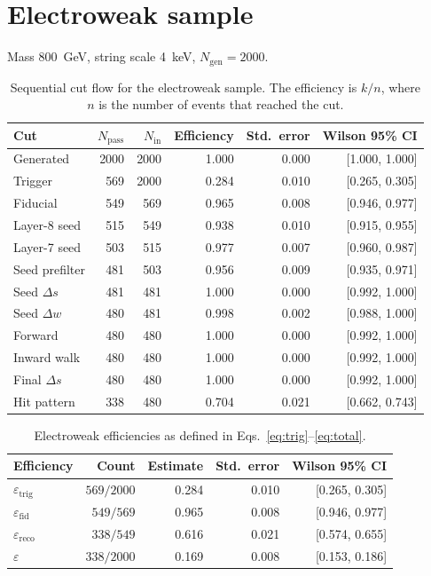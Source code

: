 \documentclass[11pt,a4paper]{article}
\begin{document}
\section{Electroweak sample}
\label{sec:ew}
Mass \SI{800}{\GeV}, string scale \SI{4}{\keV}, \(N_{\mathrm{gen}} = 2000\).

\begin{table}[H]
\centering
\caption{Sequential cut flow for the electroweak sample. The efficiency is \(k/n\), where \(n\) is the number of events that reached the cut.}
\label{tab:ew-cuts}
\small
\begin{tabular}{lrrrrr}
\toprule
Cut & \(N_{\mathrm{pass}}\) & \(N_{\mathrm{in}}\) & Efficiency & Std.\ error & Wilson 95\% CI \\
\midrule
Generated        & 2000 & 2000 & 1.000 & 0.000 & [1.000, 1.000] \\
Trigger          &  569 & 2000 & 0.284 & 0.010 & [0.265, 0.305] \\
Fiducial         &  549 &  569 & 0.965 & 0.008 & [0.946, 0.977] \\
Layer-8 seed     &  515 &  549 & 0.938 & 0.010 & [0.915, 0.955] \\
Layer-7 seed     &  503 &  515 & 0.977 & 0.007 & [0.960, 0.987] \\
Seed prefilter   &  481 &  503 & 0.956 & 0.009 & [0.935, 0.971] \\
Seed \(\Delta s\) &  481 &  481 & 1.000 & 0.000 & [0.992, 1.000] \\
Seed \(\Delta w\) &  480 &  481 & 0.998 & 0.002 & [0.988, 1.000] \\
Forward          &  480 &  480 & 1.000 & 0.000 & [0.992, 1.000] \\
Inward walk      &  480 &  480 & 1.000 & 0.000 & [0.992, 1.000] \\
Final \(\Delta s\) &  480 &  480 & 1.000 & 0.000 & [0.992, 1.000] \\
Hit pattern      &  338 &  480 & 0.704 & 0.021 & [0.662, 0.743] \\
\bottomrule
\end{tabular}
\end{table}

\begin{table}[H]
\centering
\caption{Electroweak efficiencies as defined in Eqs.~\eqref{eq:trig}--\eqref{eq:total}.}
\label{tab:ew-eff}
\begin{tabular}{lrrrr}
\toprule
Efficiency & Count & Estimate & Std.\ error & Wilson 95\% CI \\
\midrule
\(\varepsilon_{\mathrm{trig}}\) & \(569/2000\) & 0.284 & 0.010 & [0.265, 0.305] \\
\(\varepsilon_{\mathrm{fid}}\)  & \(549/569\)  & 0.965 & 0.008 & [0.946, 0.977] \\
\(\varepsilon_{\mathrm{reco}}\) & \(338/549\)  & 0.616 & 0.021 & [0.574, 0.655] \\
\(\varepsilon\)                 & \(338/2000\) & 0.169 & 0.008 & [0.153, 0.186] \\
\bottomrule
\end{tabular}
\end{table}
\end{document}
